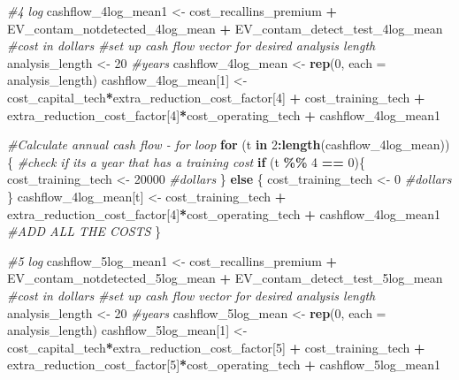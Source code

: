 \documentclass[
]{article}
\newenvironment{Shaded}{\begin{snugshade}}{\end{snugshade}}
\newcommand{\AttributeTok}[1]{\textcolor[rgb]{0.13,0.29,0.53}{#1}}
\newcommand{\CommentTok}[1]{\textcolor[rgb]{0.56,0.35,0.01}{\textit{#1}}}
\newcommand{\ControlFlowTok}[1]{\textcolor[rgb]{0.13,0.29,0.53}{\textbf{#1}}}
\newcommand{\DecValTok}[1]{\textcolor[rgb]{0.00,0.00,0.81}{#1}}
\newcommand{\FunctionTok}[1]{\textcolor[rgb]{0.13,0.29,0.53}{\textbf{#1}}}
\newcommand{\NormalTok}[1]{#1}
\newcommand{\OtherTok}[1]{\textcolor[rgb]{0.56,0.35,0.01}{#1}}
\newcommand{\SpecialCharTok}[1]{\textcolor[rgb]{0.81,0.36,0.00}{\textbf{#1}}}
\begin{document}
\begin{Shaded}
\begin{Highlighting}[]
\CommentTok{\#4 log}
\NormalTok{cashflow\_4log\_mean1 }\OtherTok{\textless{}{-}}\NormalTok{ cost\_recallins\_premium }\SpecialCharTok{+}\NormalTok{ EV\_contam\_notdetected\_4log\_mean }\SpecialCharTok{+}\NormalTok{ EV\_contam\_detect\_test\_4log\_mean }\CommentTok{\#cost in dollars}
\CommentTok{\#set up cash flow vector for desired analysis length}
\NormalTok{analysis\_length }\OtherTok{\textless{}{-}} \DecValTok{20} \CommentTok{\#years}
\NormalTok{cashflow\_4log\_mean }\OtherTok{\textless{}{-}} \FunctionTok{rep}\NormalTok{(}\DecValTok{0}\NormalTok{, }\AttributeTok{each =}\NormalTok{ analysis\_length)}
\NormalTok{cashflow\_4log\_mean[}\DecValTok{1}\NormalTok{] }\OtherTok{\textless{}{-}}\NormalTok{  cost\_capital\_tech}\SpecialCharTok{*}\NormalTok{extra\_reduction\_cost\_factor[}\DecValTok{4}\NormalTok{] }\SpecialCharTok{+}\NormalTok{  cost\_training\_tech }\SpecialCharTok{+}\NormalTok{ extra\_reduction\_cost\_factor[}\DecValTok{4}\NormalTok{]}\SpecialCharTok{*}\NormalTok{cost\_operating\_tech }\SpecialCharTok{+}\NormalTok{ cashflow\_4log\_mean1}

\CommentTok{\#Calculate annual cash flow {-} for loop}
\ControlFlowTok{for}\NormalTok{ (t }\ControlFlowTok{in} \DecValTok{2}\SpecialCharTok{:}\FunctionTok{length}\NormalTok{(cashflow\_4log\_mean))\{}
  \CommentTok{\#check if it\textquotesingle{}s a year that has a training cost}
  \ControlFlowTok{if}\NormalTok{ (t }\SpecialCharTok{\%\%} \DecValTok{4} \SpecialCharTok{==} \DecValTok{0}\NormalTok{)\{}
\NormalTok{    cost\_training\_tech }\OtherTok{\textless{}{-}} \DecValTok{20000} \CommentTok{\#dollars}
\NormalTok{  \} }\ControlFlowTok{else}\NormalTok{ \{}
\NormalTok{    cost\_training\_tech }\OtherTok{\textless{}{-}} \DecValTok{0} \CommentTok{\#dollars}
\NormalTok{  \}}
\NormalTok{  cashflow\_4log\_mean[t] }\OtherTok{\textless{}{-}}\NormalTok{ cost\_training\_tech }\SpecialCharTok{+}\NormalTok{ extra\_reduction\_cost\_factor[}\DecValTok{4}\NormalTok{]}\SpecialCharTok{*}\NormalTok{cost\_operating\_tech }\SpecialCharTok{+}\NormalTok{ cashflow\_4log\_mean1 }\CommentTok{\#ADD ALL THE COSTS}
\NormalTok{\}}



\CommentTok{\#5 log}
\NormalTok{cashflow\_5log\_mean1 }\OtherTok{\textless{}{-}}\NormalTok{ cost\_recallins\_premium }\SpecialCharTok{+}\NormalTok{ EV\_contam\_notdetected\_5log\_mean }\SpecialCharTok{+}\NormalTok{ EV\_contam\_detect\_test\_5log\_mean }\CommentTok{\#cost in dollars}
\CommentTok{\#set up cash flow vector for desired analysis length}
\NormalTok{analysis\_length }\OtherTok{\textless{}{-}} \DecValTok{20} \CommentTok{\#years}
\NormalTok{cashflow\_5log\_mean }\OtherTok{\textless{}{-}} \FunctionTok{rep}\NormalTok{(}\DecValTok{0}\NormalTok{, }\AttributeTok{each =}\NormalTok{ analysis\_length)}
\NormalTok{cashflow\_5log\_mean[}\DecValTok{1}\NormalTok{] }\OtherTok{\textless{}{-}}\NormalTok{ cost\_capital\_tech}\SpecialCharTok{*}\NormalTok{extra\_reduction\_cost\_factor[}\DecValTok{5}\NormalTok{] }\SpecialCharTok{+}\NormalTok{  cost\_training\_tech }\SpecialCharTok{+}\NormalTok{ extra\_reduction\_cost\_factor[}\DecValTok{5}\NormalTok{]}\SpecialCharTok{*}\NormalTok{cost\_operating\_tech }\SpecialCharTok{+}\NormalTok{ cashflow\_5log\_mean1}


\end{Highlighting}
\end{Shaded}
\end{document}
